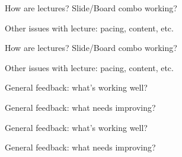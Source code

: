 \documentclass{beamer}
\begin{document}
\begin{frame}{How are lectures? Slide/Board combo working?}

  \begin{block}{Other issues with lecture: pacing, content, etc.}
    \end{block}

\end{frame}
\begin{frame}{How are lectures? Slide/Board combo working?}

  \begin{block}{Other issues with lecture: pacing, content, etc.}
    \end{block}

\end{frame}
\begin{frame}{General feedback: what's working well?}

  \begin{block}{General feedback: what needs improving?}
    \end{block}

\end{frame}
\begin{frame}{General feedback: what's working well?}

  \begin{block}{General feedback: what needs improving?}
    \end{block}

\end{frame}

  
\end{document}
